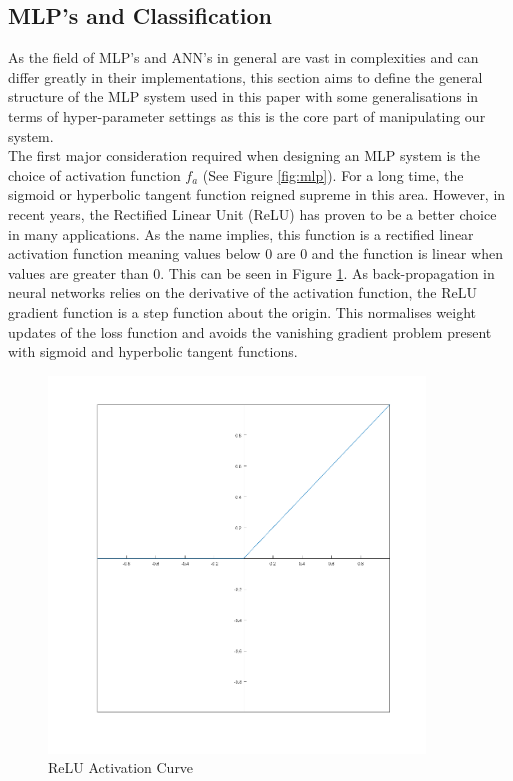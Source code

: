 \documentclass[11pt]{article}
\begin{document}
	\subsection{MLP's and Classification}\label{sec:mlp_class}
	As the field of MLP's and ANN's in general are vast in complexities and can differ greatly in their implementations, this section aims to define the general structure of the MLP system used in this paper with some generalisations in terms of hyper-parameter settings as this is the core part of manipulating our system.\\
	
	\noindent
	The first major consideration required when designing an MLP system is the choice of activation function $f_a$ (See Figure \ref{fig:mlp}). For a long time, the sigmoid or hyperbolic tangent function reigned supreme in this area. However, in recent years, the Rectified Linear Unit (ReLU) has proven to be a better choice in many applications. As the name implies, this function is a rectified linear activation function meaning values below 0 are 0 and the function is linear when values are greater than 0. This can be seen in Figure \ref{fig:relu}. As back-propagation in neural networks relies on the derivative of the activation function, the ReLU gradient function is a step function about the origin. This normalises weight updates of the loss function and avoids the vanishing gradient problem present with sigmoid and hyperbolic tangent functions.\\
		
	\begin{figure}[H]
		\centering
		\includegraphics[width=10cm]{Figures/relu}
		\caption{ReLU Activation Curve}
		\label{fig:relu}
	\end{figure}
\end{document}
